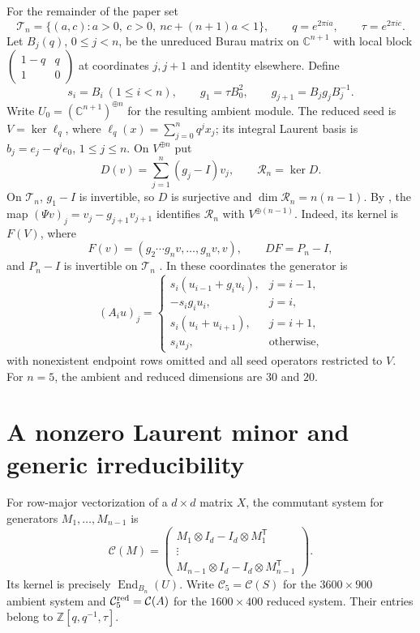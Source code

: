 \documentclass[11pt,a4paper]{article}
\newcommand{\C}{\mathbb C}
\newcommand{\Z}{\mathbb Z}
\newcommand{\Rcal}{\mathcal R}
\newcommand{\Tcal}{\mathcal T}
\newcommand{\End}{\operatorname{End}}
\begin{document}
For the remainder of the paper set
\[
 \Tcal_n=\{(a,c):a>0,\ c>0,\ nc+(n+1)a<1\},\qquad
 q=e^{2\pi ia},\qquad \tau=e^{2\pi ic}.
\]
Let $B_j(q)$, $0\le j<n$, be the unreduced Burau matrix on
$\C^{n+1}$ with local block
$\left(\begin{smallmatrix}1-q&q\\1&0\end{smallmatrix}\right)$
at coordinates $j,j+1$ and identity elsewhere. Define
\[
 s_i=B_i\ (1\le i<n),\qquad g_1=\tau B_0^2,
 \qquad g_{j+1}=B_jg_jB_j^{-1}.
\]
Write $U_0=(\C^{n+1})^{\oplus n}$ for the resulting ambient module.
The reduced seed is $V=\ker\ell_q$, where
$\ell_q(x)=\sum_{j=0}^n q^jx_j$; its integral Laurent basis is
$b_j=e_j-q^je_0$, $1\le j\le n$. On $V^{\oplus n}$ put
\[
 D(v)=\sum_{j=1}^n(g_j-I)v_j,\qquad \Rcal_n=\ker D.
\]
On $\Tcal_n$, $g_1-I$ is invertible, so $D$ is surjective and
$\dim\Rcal_n=n(n-1)$. By \cite[Proposition~5.9]{Negami},
the map $(\Psi v)_j=v_j-g_{j+1}v_{j+1}$ identifies $\Rcal_n$
with $V^{\oplus(n-1)}$. Indeed, its kernel is $F(V)$, where
\[
 F(v)=(g_2\cdots g_nv,\ldots,g_nv,v),\qquad
 DF=P_n-I,
\]
and $P_n-I$ is invertible on $\Tcal_n$
\cite[Theorem~5.3 and Remark~5.8]{Negami}.
In these coordinates the generator is
\begin{equation}\label{eq:A}
 (A_iu)_j=
 \begin{cases}
 s_i(u_{i-1}+g_iu_i),&j=i-1,\\
 -s_ig_iu_i,&j=i,\\
 s_i(u_i+u_{i+1}),&j=i+1,\\
 s_iu_j,&\text{otherwise},
 \end{cases}
\end{equation}
with nonexistent endpoint rows omitted and all seed operators restricted
to $V$. For $n=5$, the ambient and reduced dimensions are $30$ and $20$.

\section{A nonzero Laurent minor and generic irreducibility}

For row-major vectorization of a $d\times d$ matrix $X$, the
commutant system for generators $M_1,\ldots,M_{n-1}$ is
\begin{equation}\label{eq:C}
 \mathcal C(M)=\begin{pmatrix}
 M_1\otimes I_d-I_d\otimes M_1^{\mathsf T}\\
 \vdots\\
 M_{n-1}\otimes I_d-I_d\otimes M_{n-1}^{\mathsf T}
 \end{pmatrix}.
\end{equation}
Its kernel is precisely $\End_{B_n}(U)$.
Write $\mathcal C_5=\mathcal C(S)$ for the $3600\times900$
ambient system and $\mathcal C^{\rm red}_5=\mathcal C(A)$ for the
$1600\times400$ reduced system. Their entries belong to
$\Z[q,q^{-1},\tau]$.
\end{document}
